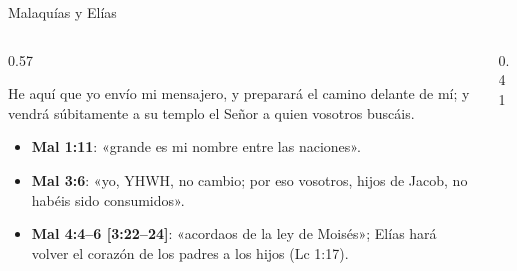 \begin{frame}{Malaquías y Elías}
\begin{columns}[c,onlytextwidth]
\begin{column}{0.57\textwidth}
\begin{cita}He aquí que yo envío mi mensajero, y preparará el camino delante de mí; y vendrá súbitamente a su templo el Señor a quien vosotros buscáis.\end{cita}
\scriptsize
\begin{itemize}
\item \textbf{Mal 1:11}: «grande es mi nombre entre las naciones».
\item \textbf{Mal 3:6}: «yo, YHWH, no cambio; por eso vosotros, hijos de Jacob, no habéis sido consumidos».
\item \textbf{Mal 4:4--6 [3:22--24]}: «acordaos de la ley de Moisés»; Elías hará volver el corazón de los padres a los hijos (Lc 1:17).
\end{itemize}
\end{column}
\begin{column}{0.41\textwidth}\end{column}
\end{columns}
\end{frame}

